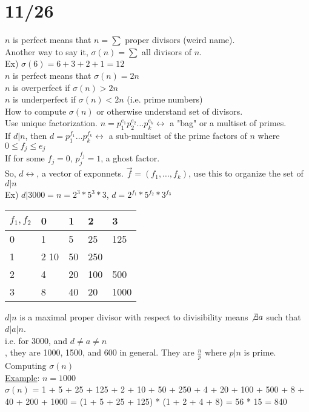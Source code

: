 \documentclass[13pt]{article}
\begin{document}
\section*{11/26}
	$n$ is perfect means that $n = \sum$ proper divisors (weird name).\\
	Another way to say it, $\sigma(n) = \sum$ all divisors of $n$.\\
	Ex) $\sigma(6) = 6 + 3 + 2 + 1 = 12$\\
	$n$ is perfect means that $\sigma(n) = 2n$\\
	$n$ is overperfect if $\sigma(n) > 2n$\\
	$n$ is underperfect if $\sigma(n) < 2n$ (i.e. prime numbers)\\
	How to compute $\sigma(n)$ or otherwise understand set of divisors.\\
	Use unique factorization. $n= p_1^{e_1} p_2^{e_2}\ldots p_k^{e_k} 
	\leftrightarrow $ a "bag" or a multiset of primes.\\
	If $d|n$, then $d = p_1^{f_1}\ldots p_k^{f_k} \leftrightarrow $ a 
	sub-multiset of the prime factors of $n$ where $0 \le f_j \le e_j$\\
	If for some $f_j = 0$, $p_j^{f_j} = 1$, a ghost factor.\\
	So, $d \leftrightarrow$, a vector of exponnets. $\overrightarrow{f} = (f_1,
	\ldots, f_k)$, use this to organize the set of $d | n$\\
	Ex) $d | 3000 = n = 2^3 * 5^3 * 3$, $d = 2^{f_1} * 5^{f_2} *3^{f_3}$
	\begin{tabular}{l | l  l  l  l}
		$f_1, f_2$ & 0 & 1 & 2 & 3\\
		\hline
		0 & 1 & 5 & 25 & 125 \\
		1 & 2 10 & 50 & 250 \\
		2 & 4 & 20 & 100 & 500\\
		3 & 8 & 40 & 20 & 1000 \\
	\end{tabular}
	$d|n$ is a maximal proper divisor with respect to divisibility means
	$\not\exists a$ such that $d | a | n$.\\
	i.e. for 3000, and $d \not= a \not= n$\\, they are 1000, 1500, and 600
	in general. They are $\frac{n}{p}$ where $p | n$ is prime.\\
	Computing $\sigma(n)$\\
	\underline{Example}: $n = 1000$\\
	$\sigma(n)$ = 1 + 5 + 25 + 125 + 2 + 10 + 50 + 250 + 4 + 20 + 100 + 500 + 
	8 + 40 + 200 + 1000 = (1 + 5 + 25 + 125) * (1 + 2 + 4 + 8) = 56 * 15 = 840\\
\end{document}
